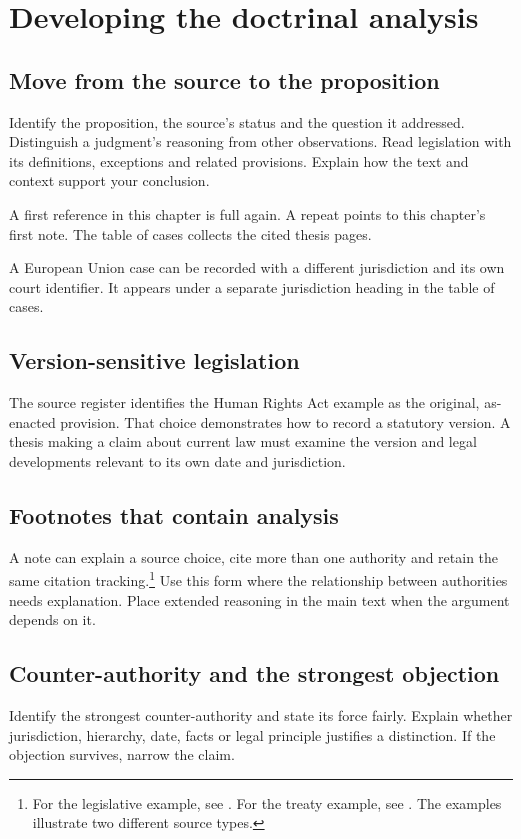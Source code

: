 \chapter{Developing the doctrinal analysis}\label{ch:doctrine}
\section{Move from the source to the proposition}
Identify the proposition, the source's status and the question it addressed.
Distinguish a judgment's reasoning from other observations. Read legislation
with its definitions, exceptions and related provisions. Explain how the text
and context support your conclusion.

A first reference in this chapter is full again.
A repeat points to this chapter's first note.
The table of cases collects the cited thesis pages.

A European Union case can be recorded with a different jurisdiction and
its own court identifier.
It appears under a separate jurisdiction heading in the table of cases.

\section{Version-sensitive legislation}
The source register identifies the Human Rights Act example as the original,
as-enacted provision.
That choice demonstrates how to record a statutory version. A thesis making a
claim about current law must examine the version and legal developments relevant
to its own date and jurisdiction.

\section{Footnotes that contain analysis}
A note can explain a source choice, cite more than one authority and retain the
same citation tracking.\footnote{For the legislative example, see
. For the treaty example, see
. The examples illustrate two different source types.}
Use this form where the relationship between authorities needs explanation.
Place extended reasoning in the main text when the argument depends on it.

\section{Counter-authority and the strongest objection}
Identify the strongest counter-authority and state its force fairly.
Explain whether jurisdiction, hierarchy, date, facts or legal principle
justifies a distinction. If the objection survives, narrow the claim.


